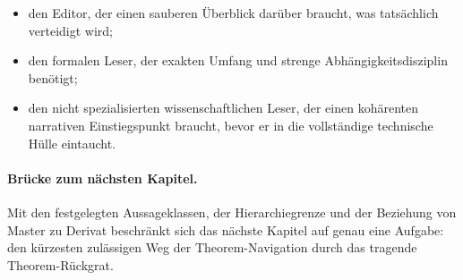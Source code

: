 \begin{itemize}
\item den Editor, der einen sauberen Überblick darüber braucht, was tatsächlich
      verteidigt wird;
\item den formalen Leser, der exakten Umfang und strenge Abhängigkeitsdisziplin
      benötigt;
\item den nicht spezialisierten wissenschaftlichen Leser, der einen kohärenten
      narrativen Einstiegspunkt braucht, bevor er in die vollständige technische
      Hülle eintaucht.
\end{itemize}

\paragraph{Brücke zum nächsten Kapitel.}
Mit den festgelegten Aussageklassen, der Hierarchiegrenze und der Beziehung von
Master zu Derivat beschränkt sich das nächste Kapitel auf genau eine Aufgabe:
den kürzesten zulässigen Weg der Theorem-Navigation durch das tragende
Theorem-Rückgrat.

\clearpage
